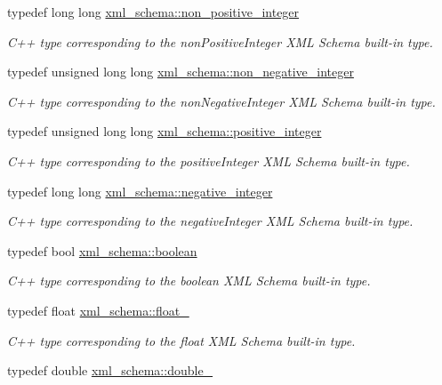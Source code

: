 \begin{DoxyCompactItemize}
typedef long long \hyperlink{namespacexml__schema_a3de6073e510eb8edd71ddc6e0256e2f9}{xml\-\_\-schema\-::non\-\_\-positive\-\_\-integer}
\begin{DoxyCompactList}\small\item\em C++ type corresponding to the non\-Positive\-Integer X\-M\-L Schema built-\/in type. \end{DoxyCompactList}\item 
typedef unsigned long long \hyperlink{namespacexml__schema_af42ef5911d65f41a0a03598b056f05aa}{xml\-\_\-schema\-::non\-\_\-negative\-\_\-integer}
\begin{DoxyCompactList}\small\item\em C++ type corresponding to the non\-Negative\-Integer X\-M\-L Schema built-\/in type. \end{DoxyCompactList}\item 
typedef unsigned long long \hyperlink{namespacexml__schema_abe9d639a15a121d2868ae2f9c974ca24}{xml\-\_\-schema\-::positive\-\_\-integer}
\begin{DoxyCompactList}\small\item\em C++ type corresponding to the positive\-Integer X\-M\-L Schema built-\/in type. \end{DoxyCompactList}\item 
typedef long long \hyperlink{namespacexml__schema_acf9528a84381d07f2802785c947bf441}{xml\-\_\-schema\-::negative\-\_\-integer}
\begin{DoxyCompactList}\small\item\em C++ type corresponding to the negative\-Integer X\-M\-L Schema built-\/in type. \end{DoxyCompactList}\item 
typedef bool \hyperlink{namespacexml__schema_ae5ada4ec9c54b51765c3e4c0e9631bba}{xml\-\_\-schema\-::boolean}
\begin{DoxyCompactList}\small\item\em C++ type corresponding to the boolean X\-M\-L Schema built-\/in type. \end{DoxyCompactList}\item 
typedef float \hyperlink{namespacexml__schema_ad7e04ab17bba0b3fdde43fb79ef6ed87}{xml\-\_\-schema\-::float\-\_\-}
\begin{DoxyCompactList}\small\item\em C++ type corresponding to the float X\-M\-L Schema built-\/in type. \end{DoxyCompactList}\item 
typedef double \hyperlink{namespacexml__schema_aac2d3d3483d3a20e8d96d2e8e5b3a470}{xml\-\_\-schema\-::double\-\_\-}

\end{DoxyCompactItemize}
